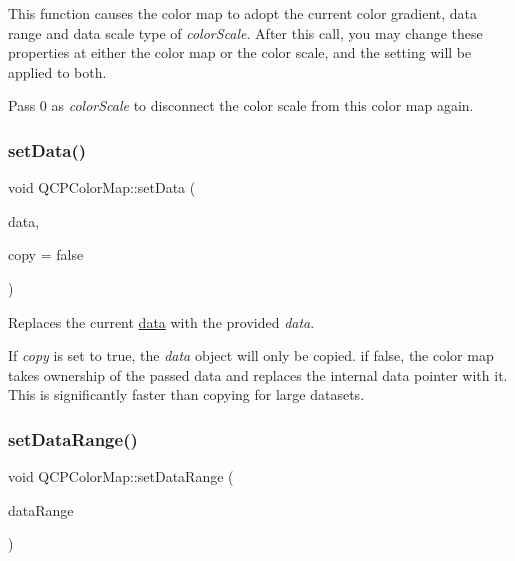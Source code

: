 This function causes the color map to adopt the current color gradient, data range and data scale type of {\itshape color\+Scale}. After this call, you may change these properties at either the color map or the color scale, and the setting will be applied to both.

Pass 0 as {\itshape color\+Scale} to disconnect the color scale from this color map again. \mbox{\label{classQCPColorMap_a5a23e133a20c4ccad35fd32e6c0f9809}} 
\subsubsection{\texorpdfstring{set\+Data()}{setData()}}
{\footnotesize\ttfamily void Q\+C\+P\+Color\+Map\+::set\+Data (\begin{DoxyParamCaption}\item[{\hyperlink{classQCPColorMapData}{Q\+C\+P\+Color\+Map\+Data} $\ast$}]{data,  }\item[{bool}]{copy = {\ttfamily false} }\end{DoxyParamCaption})}

Replaces the current \hyperlink{classQCPColorMap_a047d7eb3ae657f93f2f39b5e68b79451}{data} with the provided {\itshape data}.

If {\itshape copy} is set to true, the {\itshape data} object will only be copied. if false, the color map takes ownership of the passed data and replaces the internal data pointer with it. This is significantly faster than copying for large datasets. \mbox{\label{classQCPColorMap_a980b42837821159786a85b4b7dcb8774}} 
\subsubsection{\texorpdfstring{set\+Data\+Range()}{setDataRange()}}
{\footnotesize\ttfamily void Q\+C\+P\+Color\+Map\+::set\+Data\+Range (\begin{DoxyParamCaption}\item[{const \hyperlink{classQCPRange}{Q\+C\+P\+Range} \&}]{data\+Range }\end{DoxyParamCaption})}


